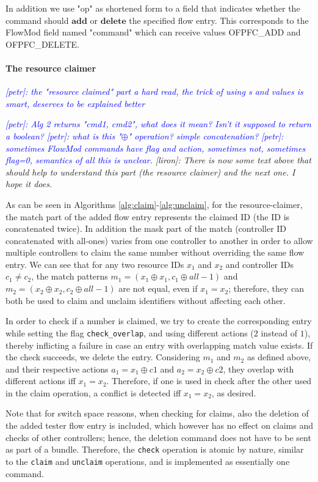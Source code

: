 \documentclass[conference]{sigcomm-alternate}
\newcommand{\concat}[0]{\oplus}
\newcommand{\claimcheck}{check\xspace}
\newcommand{\add}{\textbf{add}\xspace}
\newcommand{\dele}{\textbf{delete}\xspace}
\newcommand{\checko}{\texttt{check\_overlap}\xspace}
\newcommand{\liron}[1]{\textit{\textcolor{mygreen}{[liron]: #1}}} %
\newcommand{\petr}[1]{\textit{\textcolor{blue}{[petr]: #1}}} %
\begin{document}
In addition we use "op" as shortened form to a field that indicates whether the command should $\add$ or $\dele$ the specified flow entry. This corresponds to the FlowMod field named "command" which can receive values OFPFC\_ADD and OFPFC\_DELETE.

\paragraph{The resource claimer}
\petr{
the "resource claimed" part a hard read, the trick of using s and values is smart, deserves to be explained better
}

\petr{Alg 2 returns "cmd1, cmd2", what does it mean? Isn't it supposed to return a boolean?}
\petr{what is this "$\concat$" operation? simple concatenation?}
\petr{sometimes FlowMod commands have flag and action, sometimes not, sometimes flag=0, semantics of all this is unclear.}
\liron{There is now some text above that should help to understand this part (the resource claimer) and the next one. I hope it does.}

As can be seen in Algorithms \ref{alg:claim}-\ref{alg:unclaim}, for the resource-claimer,
the match part of the added flow entry represents the claimed ID (the ID is concatenated twice). 
In addition the mask part of the match (controller ID concatenated with all-ones) varies from one controller
to another in order to allow multiple controllers to claim the same number without overriding the same flow entry. 
We can see that for any two resource IDs $x_1$ and $x_2$ and controller IDs $c_1\neq c_2$,
the match patterns $m_1=(x_1\concat x_1, c_1\concat all-1)$ and $ m_2=(x_2\concat x_2, c_2\concat all-1)$ are not equal,
even if $x_1=x_2$; therefore, they can both be used to claim and unclaim identifiers without affecting each other.

In order to check if a number is claimed, we try to create the
corresponding entry while setting the
flag \texttt{\checko}, and using different actions ($2$ instead of $1$), thereby inflicting
a failure in case an entry with overlapping match value exists.
If the check succeeds, we delete the entry. Considering $m_1$ and $m_2$ as defined above,
and their respective actions $a_1=x_1\concat c1$ and $a_2=x_2\concat c2$,  they overlap
with different actions iff $x_1=x_2$. Therefore, if one is used in \claimcheck after the other used in the claim operation,
a conflict is detected iff $x_1=x_2$, as desired.

Note that for switch space reasons, when checking for claims, also the deletion of the added tester flow entry is included,
which however has no effect on claims and checks of other controllers; hence, the deletion command does not
have to be sent as part of a bundle. Therefore, the \texttt{\claimcheck} operation is atomic by nature,
similar to the \texttt{claim} and \texttt{unclaim} operations, and is implemented as essentially one command.
\end{document}
